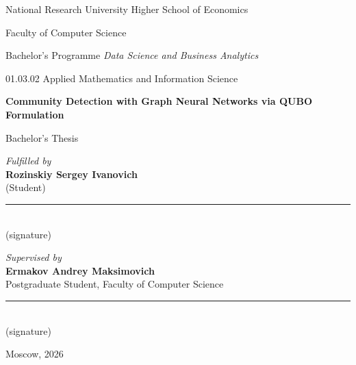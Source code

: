 
\thispagestyle{empty}

\begin{center}
\vspace*{0pt}

National Research University Higher School of Economics

\vspace{4pt}

Faculty of Computer Science

\vspace{4pt}

Bachelor's Programme \emph{Data Science and Business Analytics}

\vspace{4pt}

01.03.02 Applied Mathematics and Information Science

\vspace{80pt}

{\Large\textbf{Community Detection with Graph Neural Networks via QUBO Formulation}}

\vspace{40pt}

{\large Bachelor's Thesis}

\end{center}

\vspace{60pt}

\begin{flushright}
\textit{Fulfilled by} \\[10pt]

\textbf{Rozinskiy Sergey Ivanovich} \\
\small (Student) \\[20pt]

\rule{6cm}{0.4pt} \\
\small (signature)
\end{flushright}

\vspace{40pt}

\begin{flushright}
\textit{Supervised by} \\[10pt]

\textbf{Ermakov Andrey Maksimovich} \\
\small Postgraduate Student, Faculty of Computer Science \\[20pt]

\rule{6cm}{0.4pt} \\
\small (signature)
\end{flushright}

\vfill

\begin{center}
Moscow, 2026
\end{center}

\newpage